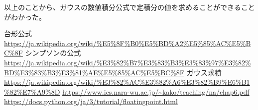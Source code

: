 \documentclass[dvipdfmx]{jsarticle}
\begin{document}
以上のことから、ガウスの数値積分公式で定積分の値を求めることができることがわかった。

\begin{thebibliography}{10}
   台形公式
  \url{https://ja.wikipedia.org/wiki/%E5%8F%B0%E5%BD%A2%E5%85%AC%E5%BC%8F}
   シンプソンの公式
  \url{https://ja.wikipedia.org/wiki/%E3%82%B7%E3%83%B3%E3%83%97%E3%82%BD%E3%83%B3%E3%81%AE%E5%85%AC%E5%BC%8F}
   ガウス求積
  \url{https://ja.wikipedia.org/wiki/%E3%82%AC%E3%82%A6%E3%82%B9%E6%B1%82%E7%A9%8D}
  \url{https://www.ics.nara-wu.ac.jp/~kako/teaching/na/chap6.pdf}
  \url{https://docs.python.org/ja/3/tutorial/floatingpoint.html}

\end{thebibliography}
\end{document}
